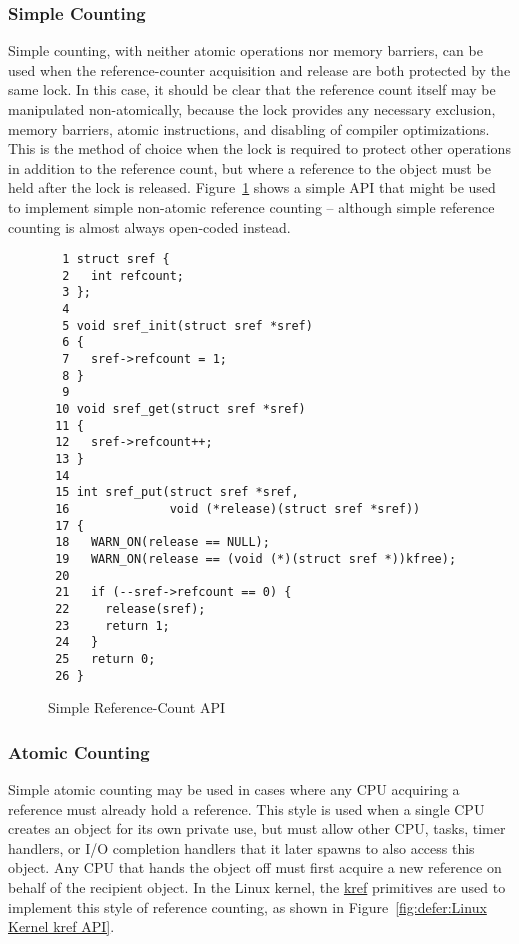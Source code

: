 \subsubsection{Simple Counting}
\label{sec:defer:Simple Counting}

Simple counting, with neither atomic operations nor memory barriers,
can be used when the reference-counter acquisition and release are
both protected by the same lock.
In this case, it should be clear that the reference count itself
may be manipulated non-atomically, because the lock provides any
necessary exclusion, memory barriers, atomic instructions, and disabling
of compiler optimizations.
This is the method of choice when the lock is required to protect
other operations in addition to the reference count, but where
a reference to the object must be held after the lock is released.
Figure~\ref{fig:defer:Simple Reference-Count API} shows a simple
API that might be used to implement simple non-atomic reference
counting -- although simple reference counting is almost always
open-coded instead.

\begin{figure}[htbp]
{ \scriptsize
\begin{verbatim}
  1 struct sref {
  2   int refcount;
  3 };
  4 
  5 void sref_init(struct sref *sref)
  6 {
  7   sref->refcount = 1;
  8 }
  9 
 10 void sref_get(struct sref *sref)
 11 {
 12   sref->refcount++;
 13 }
 14 
 15 int sref_put(struct sref *sref,
 16              void (*release)(struct sref *sref))
 17 {
 18   WARN_ON(release == NULL);
 19   WARN_ON(release == (void (*)(struct sref *))kfree);
 20 
 21   if (--sref->refcount == 0) {
 22     release(sref);
 23     return 1;
 24   }
 25   return 0;
 26 }
\end{verbatim}
}
\caption{Simple Reference-Count API}
\label{fig:defer:Simple Reference-Count API}
\end{figure}

\subsubsection{Atomic Counting}
\label{sec:defer:Atomic Counting}

Simple atomic counting may be used in cases where any CPU acquiring
a reference must already hold a reference.
This style is used when a single CPU creates an object for its
own private use, but must allow other CPU, tasks, timer handlers,
or I/O completion handlers that it later spawns to also access this object.
Any CPU that hands the object off must first acquire a new reference
on behalf of the recipient object.
In the Linux kernel, the \url{kref} primitives are used to implement
this style of reference counting, as shown in
Figure~\ref{fig:defer:Linux Kernel kref API}.


